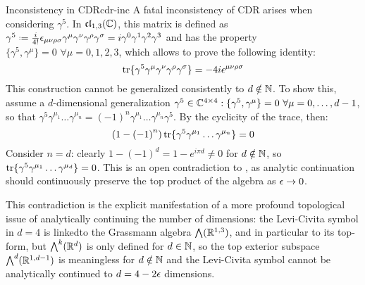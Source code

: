 \begin{observation}{Inconsistency in CDR}{cdr-inc}
  A fatal inconsistency of CDR arises when considering $ \gamma^5 $. In $ \mathfrak{cl}_{1,3}(\mathbb{C}) $, this matrix is defined as $ \gamma^5 \defeq \frac{i}{4!} \epsilon_{\mu \nu \rho \sigma} \gamma^\mu \gamma^\nu \gamma^\rho \gamma^\sigma = i \gamma^0 \gamma^1 \gamma^2 \gamma^3 $ and has the property $ \{\gamma^5 , \gamma^\mu\} = 0 \,\, \forall \mu = 0,1,2,3 $, which allows to prove the following identity:
  \begin{equation}
    \operatorname{tr}\{\gamma^5 \gamma^\mu \gamma^\nu \gamma^\rho \gamma^\sigma\} = -4 i \epsilon^{\mu \nu \rho \sigma}
    \label{eq:top-form-gamma-5}
  \end{equation}
  This construction cannot be generalized consistently to $ d \notin \mathbb{N} $. To show this, assume a $ d $-dimensional generalization $ \gamma^5 \in \mathbb{C}^{4 \times 4} : \{\gamma^5 , \gamma^\mu\} = 0 \,\,\forall \mu = 0, \dots, d-1 $, so that $ \gamma^5 \gamma^{\mu_1} \dots \gamma^{\mu_n} = \left( -1 \right)^n \gamma^{\mu_1} \dots \gamma^{\mu_n} \gamma^5 $. By the cyclicity of the trace, then:
  \begin{equation}
    \left( 1 - \left( -1 \right)^n \right) \operatorname{tr}\{\gamma^5 \gamma^{\mu_1} \dots \gamma^{\mu_n}\} = 0
  \end{equation}
  Consider $ n = d $: clearly $ 1 - \left( -1 \right)^d = 1 - e^{i \pi d} \neq 0 $ for $ d \notin \mathbb{N} $, so $ \operatorname{tr}\{\gamma^5 \gamma^{\mu_1} \dots \gamma^{\mu_d}\} = 0 $. This is an open contradiction to , as analytic continuation should continuously preserve the top product of the algebra as $ \epsilon \rightarrow 0 $.

  This contradiction is the explicit manifestation of a more profound topological issue of analytically continuing the number of dimensions: the Levi-Civita symbol in $ d = 4 $ is linked\footnotemark to the Grassmann algebra $ \bigwedge(\mathbb{R}^{1,3}) $, and in particular to its top-form, but $ \bigwedge^k(\mathbb{R}^d) $ is only defined for $ d \in \mathbb{N} $, so the top exterior subspace $ \bigwedge^d(\mathbb{R}^{1,d-1}) $ is meaningless for $ d \notin \mathbb{N} $ and the Levi-Civita symbol cannot be analytically continued to $ d = 4 - 2 \epsilon $ dimensions.
\end{observation}

